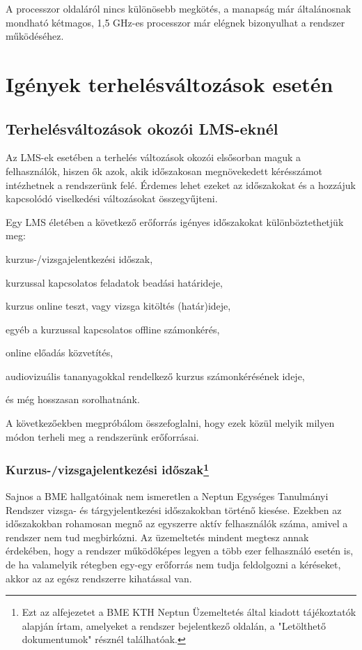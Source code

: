 A processzor oldaláról nincs különösebb megkötés, a manapság már általánosnak mondható kétmagos, 1,5 GHz-es processzor már elégnek bizonyulhat a rendszer működéséhez.

\section{Igények terhelésváltozások esetén}

\subsection{Terhelésváltozások okozói LMS-eknél}

Az LMS-ek esetében a terhelés változások okozói elsősorban maguk a felhasználók, hiszen ők azok, akik időszakosan megnövekedett kérésszámot intézhetnek a rendszerünk felé. Érdemes lehet ezeket az időszakokat és a hozzájuk kapcsolódó viselkedési változásokat összegyűjteni.

Egy LMS életében a következő erőforrás igényes időszakokat különböztethetjük meg:
\begin{sajat_itemize}
\item kurzus-/vizsgajelentkezési időszak,
\item kurzussal kapcsolatos feladatok beadási határideje,
\item kurzus online teszt, vagy vizsga kitöltés (határ)ideje,
\item egyéb a kurzussal kapcsolatos offline számonkérés,
\item online előadás közvetítés,
\item audiovizuális tananyagokkal rendelkező kurzus számonkérésének ideje, 
\end{sajat_itemize}
és még hosszasan sorolhatnánk.

A következőekben megpróbálom összefoglalni, hogy ezek közül melyik milyen módon terheli meg a rendszerünk erőforrásai.

\subsubsection{Kurzus-/vizsgajelentkezési időszak\protect\footnote{Ezt az alfejezetet a BME KTH Neptun Üzemeltetés által kiadott tájékoztatók alapján írtam, amelyeket a rendszer bejelentkező oldalán, a "Letölthető dokumentumok" résznél találhatóak.}}

Sajnos a BME hallgatóinak nem ismeretlen a Neptun Egységes Tanulmányi Rendszer vizsga- és tárgyjelentkezési időszakokban történő kiesése. Ezekben az időszakokban rohamosan megnő az egyszerre aktív felhasználók száma, amivel a rendszer nem tud megbirkózni. Az üzemeltetés mindent megtesz annak érdekében, hogy a rendszer működőképes legyen a több ezer felhasználó esetén is, de ha valamelyik rétegben egy-egy erőforrás nem tudja feldolgozni a kéréseket, akkor az az egész rendszerre kihatással van.

